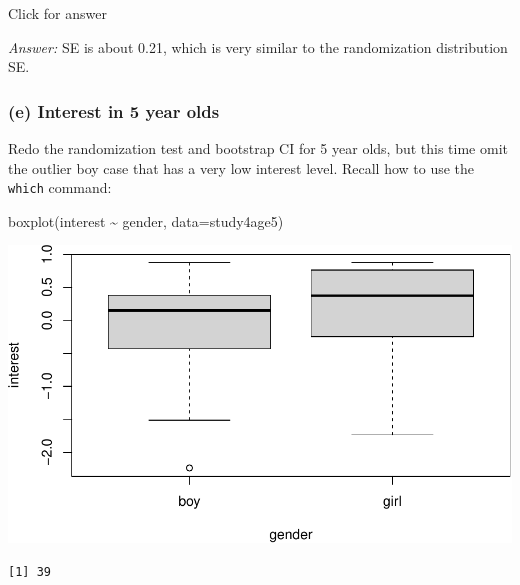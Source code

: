 \documentclass[
]{book}
\newenvironment{Shaded}{\begin{snugshade}}{\end{snugshade}}
\newcommand{\AttributeTok}[1]{\textcolor[rgb]{0.77,0.63,0.00}{#1}}
\newcommand{\DecValTok}[1]{\textcolor[rgb]{0.00,0.00,0.81}{#1}}
\newcommand{\FunctionTok}[1]{\textcolor[rgb]{0.00,0.00,0.00}{#1}}
\newcommand{\NormalTok}[1]{#1}
\newcommand{\SpecialCharTok}[1]{\textcolor[rgb]{0.00,0.00,0.00}{#1}}
\begin{document}
Click for answer

\emph{Answer:} SE is about 0.21, which is very similar to the randomization distribution SE.

\hypertarget{e-interest-in-5-year-olds}{%
\subsubsection{(e) Interest in 5 year olds}\label{e-interest-in-5-year-olds}}

Redo the randomization test and bootstrap CI for 5 year olds, but this time omit the outlier boy case that has a very low interest level. Recall how to use the \texttt{which} command:

\begin{Shaded}
\begin{Highlighting}[]
\FunctionTok{boxplot}\NormalTok{(interest }\SpecialCharTok{\textasciitilde{}}\NormalTok{ gender, }\AttributeTok{data=}\NormalTok{study4age5)}
\end{Highlighting}
\end{Shaded}

\includegraphics[width=1\linewidth]{Class_Activity_14_files/figure-latex/unnamed-chunk-10-1}

\begin{Shaded}
\end{Shaded}

\begin{verbatim}
[1] 39
\end{verbatim}
\end{document}
